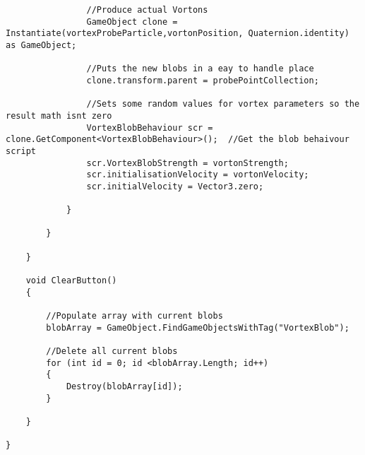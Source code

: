 \begin{mdframed}[linecolor=black, topline=true, bottomline=true,
  leftline=false, rightline=false]
\begin{verbatim}
                //Produce actual Vortons
                GameObject clone = Instantiate(vortexProbeParticle,vortonPosition, Quaternion.identity) as GameObject;

                //Puts the new blobs in a eay to handle place
                clone.transform.parent = probePointCollection;

                //Sets some random values for vortex parameters so the result math isnt zero
                VortexBlobBehaviour scr = clone.GetComponent<VortexBlobBehaviour>();  //Get the blob behaivour script
                scr.VortexBlobStrength = vortonStrength;
                scr.initialisationVelocity = vortonVelocity;
                scr.initialVelocity = Vector3.zero;

            }

        }

    }

    void ClearButton()
    {

        //Populate array with current blobs
        blobArray = GameObject.FindGameObjectsWithTag("VortexBlob");

        //Delete all current blobs
        for (int id = 0; id <blobArray.Length; id++)
        {
            Destroy(blobArray[id]);
        }

    }

}
\end{verbatim}
\end{mdframed}